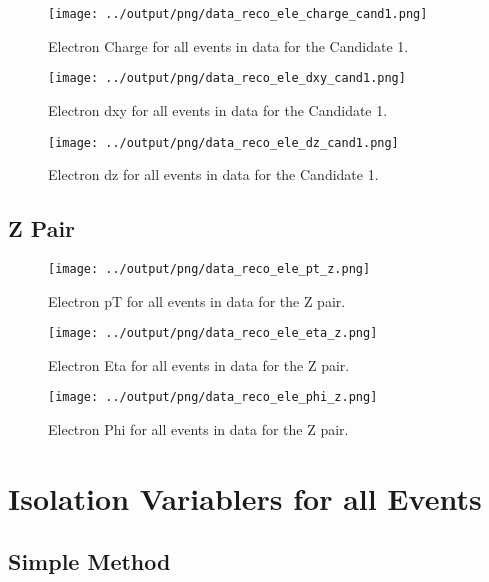 \documentclass[11pt]{book}
\begin{document}
\begin{figure}[htb]
\centering
\texttt{[image: ../output/png/data\_reco\_ele\_charge\_cand1.png]}
\caption{Electron Charge for all events in data for the Candidate 1.}
\label{fig:data_ele_charge_cand1}
\end{figure}

\begin{figure}[htb]
\centering
\texttt{[image: ../output/png/data\_reco\_ele\_dxy\_cand1.png]}
\caption{Electron dxy for all events in data for the Candidate 1.}
\label{fig:data_ele_dxy_cand1}
\end{figure}

\begin{figure}[htb]
\centering
\texttt{[image: ../output/png/data\_reco\_ele\_dz\_cand1.png]}
\caption{Electron dz for all events in data for the Candidate 1.}
\label{fig:data_ele_dz_cand1}
\end{figure}
\clearpage


\section{Z Pair}

\begin{figure}[htb]
\centering
\texttt{[image: ../output/png/data\_reco\_ele\_pt\_z.png]}
\caption{Electron pT for all events in data for the Z pair.}
\label{fig:data_ele_pt_z}
\end{figure}

\begin{figure}[htb]
\centering
\texttt{[image: ../output/png/data\_reco\_ele\_eta\_z.png]}
\caption{Electron Eta for all events in data for the Z pair.}
\label{fig:data_ele_eta_z}
\end{figure}

\begin{figure}[htb]
\centering
\texttt{[image: ../output/png/data\_reco\_ele\_phi\_z.png]}
\caption{Electron Phi for all events in data for the Z pair.}
\label{fig:data_ele_phi_z}
\end{figure}

\clearpage

\chapter{Isolation Variablers for all Events}
\section{Simple Method}
\end{document}
